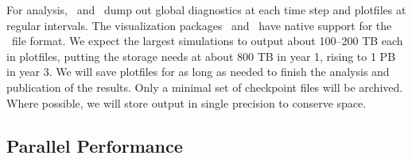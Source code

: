 For analysis, \maestro\ and \castro\ dump out global
diagnostics at each time step and plotfiles at regular intervals.  The
visualization packages \visit\ and \yt\ have native support for the
\boxlib\ file format.  We expect the largest simulations
to output about 100--200 TB each in plotfiles, putting the storage needs at about
800 TB in year 1, rising to 1 PB in year 3.  We will save plotfiles for as long as needed to finish the
analysis and publication of the results.  Only a minimal set of checkpoint
files will be archived.  Where possible, we will store output in single precision
to conserve space.




\subsection{Parallel Performance}


